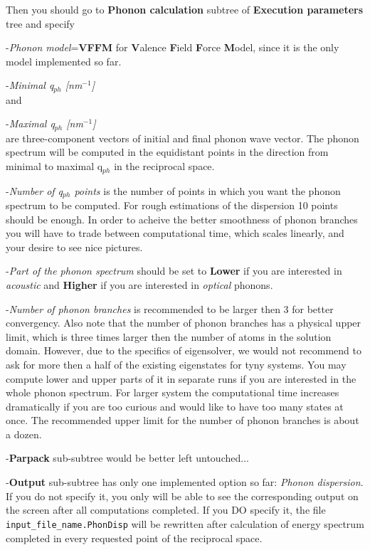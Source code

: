 \documentclass[12pt]{article}
\begin{document}
Then you should go to {\bf Phonon calculation} subtree of {\bf
Execution parameters} tree and specify

-{\it Phonon model}={\bf VFFM} for {\bf V}alence {\bf F}ield {\bf
 F}orce {\bf M}odel, since it is the only model implemented so far.

-{\it Minimal q$_{ph}$ [nm$^{-1}$]}\\
and

-{\it Maximal q$_{ph}$ [nm$^{-1}$]}\\ 
are three-component vectors of
initial and final phonon wave vector. The phonon spectrum will be
computed in the equidistant points in the direction from minimal to
maximal q$_{ph}$ in the reciprocal space.

-{\it Number of q$_{ph}$ points} is the number of points in which you
 want the phonon spectrum to be computed. For rough estimations of the
 dispersion 10 points should be enough. In order to acheive the better
 smoothness of phonon branches you will have to trade between
 computational time, which scales linearly, and your desire to see nice
 pictures.

-{\it Part of the phonon spectrum} should be set to {\bf Lower} if you
 are interested in {\it acoustic} and {\bf Higher} if you are
 interested in {\it optical} phonons.

-{\it Number of phonon branches} is recommended to be larger then 3
 for better convergency. Also note that the number of phonon branches
 has a physical upper limit, which is three times larger then the
 number of atoms in the solution domain. However, due to the specifics
 of eigensolver, we would not recommend to ask for more then a half of
 the existing eigenstates for tyny systems. You may compute lower and
 upper parts of it in separate runs if you are interested in the whole
 phonon spectrum. For larger system the computational time increases
 dramatically if you are too curious and would like to have too many
 states at once. The recommended upper limit for the number of phonon
 branches is about a dozen.

-{\bf Parpack} sub-subtree would be better left untouched...

-{\bf Output} sub-subtree has only one implemented option so far: {\it
 Phonon dispersion}. If you do not specify it, you only will be able
 to see the corresponding output on the screen after all computations
 completed. If you DO specify it, the file {\tt input\_file\_name.PhonDisp} will
 be rewritten after calculation of energy spectrum completed in every
 requested point of the reciprocal space.
\end{document}
